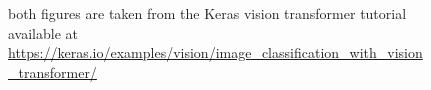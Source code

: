 \begin{figure}
\begin{subfigure}{.5\textwidth}
    \end{subfigure}
    \caption{both figures are taken from the Keras vision transformer tutorial available at \url{https://keras.io/examples/vision/image_classification_with_vision_transformer/}}
    \label{img:patches}
\end{figure}


